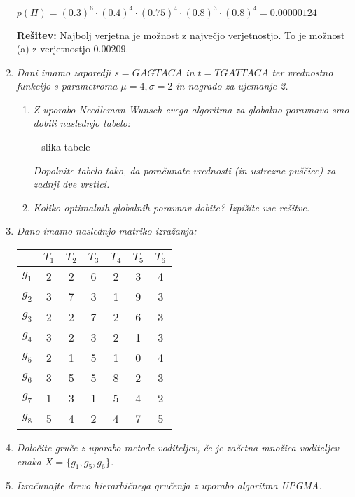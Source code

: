 \documentclass{article}
\begin{document}
\begin{enumerate}
		\begin{center}
			$p(\Pi) = (0.3)^6 \cdot (0.4)^4 \cdot (0.75)^4 \cdot (0.8)^3 \cdot (0.8)^4 = 0.00000124$
		\end{center}

		\textbf{Rešitev:} Najbolj verjetna je možnost z največjo verjetnostjo. To je možnost (a)
		z verjetnostjo $0.00209$.

	\item \textit{Dani imamo zaporedji $s=GAGTACA$ in $t=TGATTACA$ ter vrednostno funkcijo s parametroma
		$\mu = 4, \sigma = 2$ in nagrado za ujemanje 2.}

		\begin{enumerate}
			\item \textit{Z uporabo Needleman-Wunsch-evega algoritma za globalno poravnavo smo dobili
				naslednjo tabelo:}

				 -- slika tabele --

				\textit{Dopolnite tabelo tako, da poračunate vrednosti (in ustrezne puščice) za zadnji dve vrstici.}

			\item \textit{Koliko optimalnih globalnih poravnav dobite? Izpišite vse rešitve.}
		\end{enumerate}

	\item \textit{Dano imamo naslednjo matriko izražanja:}

		\begin{center}
			\begin{tabular}{c||c|c|c|c|c|c|}
				& $T_1$ & $T_2$ & $T_3$ & $T_4$ & $T_5$ & $T_6$ \\
				\hline
				\hline
				$g_1$ & 2 & 2 & 6 & 2 & 3 & 4 \\
				\hline
				$g_2$ & 3 & 7 & 3 & 1 & 9 & 3 \\
				\hline
				$g_3$ & 2 & 2 & 7 & 2 & 6 & 3 \\
				\hline
				$g_4$ & 3 & 2 & 3 & 2 & 1 & 3 \\
				\hline
				$g_5$ & 2 & 1 & 5 & 1 & 0 & 4 \\
				\hline
				$g_6$ & 3 & 5 & 5 & 8 & 2 & 3 \\
				\hline
				$g_7$ & 1 & 3 & 1 & 5 & 4 & 2 \\
				\hline
				$g_8$ & 5 & 4 & 2 & 4 & 7 & 5
			\end{tabular}
		\end{center}

		\item \textit{Določite gruče z uporabo metode voditeljev, če je začetna množica voditeljev
			enaka $X = \{g_1, g_5, g_6\}$.}

		\item \textit{Izračunajte drevo hierarhičnega gručenja z uporabo algoritma UPGMA.}

\end{enumerate}
\end{document}
